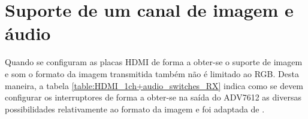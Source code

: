 \section{Suporte de um canal de imagem e áudio} \label {sec:HDMIconfig+audio_switches}

Quando se configuram as placas HDMI de forma a obter-se o suporte de imagem e som o formato da imagem transmitida também não é limitado ao RGB. Desta maneira, a tabela \ref{table:HDMI_1ch+audio_switches_RX} indica como se devem configurar os interruptores de forma a obter-se na saída do ADV7612 as diversas possibilidades relativamente ao formato da imagem e foi adaptada de \cite{R014}.

